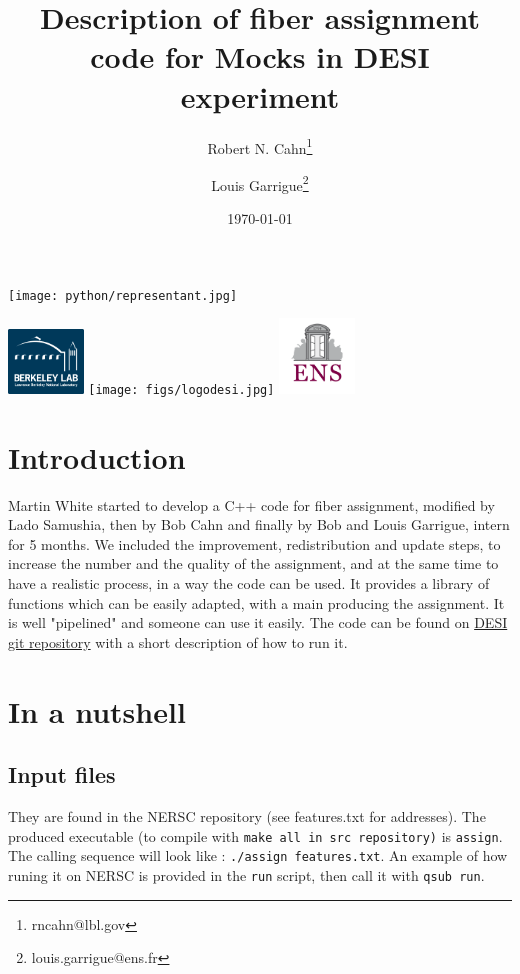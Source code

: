 \documentclass{article}
\title{Description of fiber assignment code for Mocks in DESI experiment}
\author[1]{Robert N. Cahn\thanks{rncahn@lbl.gov}}
\author[2]{Louis Garrigue\thanks{louis.garrigue@ens.fr}}
\affil[1]{Department of Cosmological Physics, LBNL, Berkeley}
\affil[2]{Departement de physique, Ecole normale superieure, Paris}
\date{\today}
\begin{document}
\begin{titlepage}
\maketitle
\begin{center}
  \texttt{[image: python/representant.jpg]}

  \includegraphics[width = 20mm]{figs/logolbnl.png} \hfill
  \texttt{[image: figs/logodesi.jpg]} \hfill
  \includegraphics[width = 20mm]{figs/logoens.png} 
\end{center}
\end{titlepage}


\section{Introduction}
Martin White started to develop a C++ code for fiber assignment, modified by Lado Samushia, then by Bob Cahn and finally by Bob and Louis Garrigue, intern for 5 months. We included the improvement, redistribution and update steps, to increase the number and the quality of the assignment, and at the same time to have a realistic process, in a way the code can be used. It provides a library of functions which can be easily adapted, with a main producing the assignment. It is well "pipelined" and someone can use it easily. The code can be found on \href{https://github.com/desihub/fiberassign}{DESI git repository} with a short description of how to run it.
  
\section{In a nutshell}
\subsection{Input files}
They are found in the NERSC repository (see features.txt for addresses).
The produced executable (to compile with {\tt make all in src repository)} is {\tt assign}. The calling sequence will look like :
{\tt./assign features.txt}. An example of how runing it on NERSC is provided in the {\tt run} script, then call it with {\tt qsub run}.
 
\end{document}
